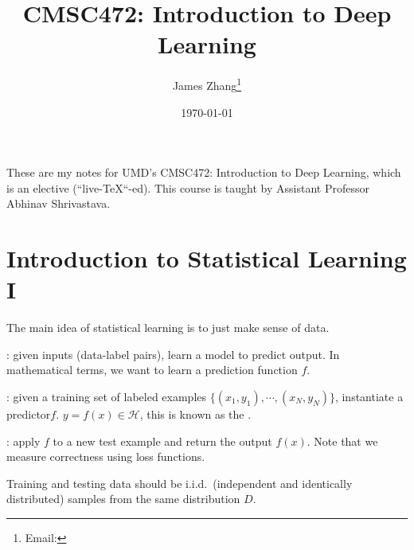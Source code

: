 \documentclass[12pt]{scrartcl}
\begin{document}
\title{CMSC472: Introduction to Deep Learning}
\author{James Zhang\thanks{Email: }}
\date{\today}



\maketitle
    These are my notes for UMD's CMSC472: Introduction to Deep Learning, 
    which is an elective (``live-\TeX``-ed). This course is taught by Assistant Professor Abhinav Shrivastava. 
\tableofcontents
\newpage

\section{Introduction to Statistical Learning I}

The main idea of statistical learning is to just make sense of data. 

\begin{definition}
  : given inputs (data-label pairs), learn a model to predict output.
  In mathematical terms, we want to learn a prediction function $f$. 
\end{definition}

\begin{definition}
  : given a training set of labeled examples $\{(x_1, y_1), 
  \cdots, (x_N, y_N)\}$, instantiate a predictor$f$. $y = f(x) \in \mathcal{H}$, this is known as the .
\end{definition}

\begin{definition}
  : apply $f$ to a new test example and return the output $f(x)$. Note that we measure correctness
  using loss functions.
\end{definition}

\begin{note}
  Training and testing data should be i.i.d.\ (independent and identically distributed) samples from the same distribution $D$.
\end{note}
\end{document}
